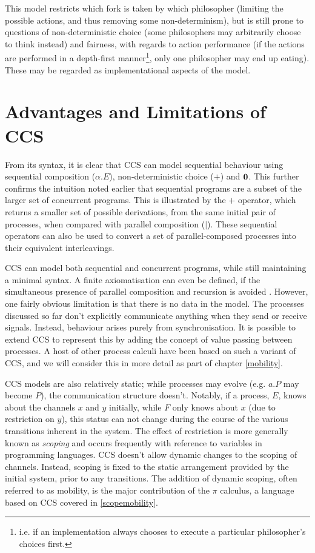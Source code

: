 This model restricts which fork is taken by which philosopher
(limiting the possible actions, and thus removing some
non-determinism), but is still prone to questions of non-deterministic
choice (some philosophers may arbitrarily choose to think instead) and
fairness, with regards to action performance (if the actions are
performed in a depth-first manner\footnote{i.e. if an implementation
  always chooses to execute a particular philosopher's choices
  first.}, only one philosopher may end up eating).  These may be
regarded as implementational aspects of the model.

\section{Advantages and Limitations of CCS}
\label{ccslimit}

From its syntax, it is clear that CCS can model sequential behaviour
using sequential composition ($\alpha.E$), non-deterministic choice
($+$) and $\textbf{0}$.  This further confirms the intuition noted earlier that
sequential programs are a subset of the larger set of concurrent
programs.  This is illustrated by the $+$ operator, which
returns a smaller set of possible derivations, from the same initial
pair of processes, when compared with parallel composition ($|$).
These sequential operators can also be used to convert a set of
parallel-composed processes into their equivalent interleavings.

CCS can model both sequential and concurrent programs, while still
maintaining a minimal syntax.  A finite axiomatisation can even be
defined, if the simultaneous presence of parallel composition and
recursion is avoided \cite{milner:ccsaxiom}.  However, one fairly
obvious limitation is that there is no data in the model.  The
processes discussed so far don't explicitly communicate anything when
they send or receive signals.  Instead, behaviour arises purely from
synchronisation.  It is possible to extend CCS to represent this by
adding the concept of value passing between processes.  A host of
other process calculi have been based on such a variant of CCS, and we
will consider this in more detail as part of chapter \ref{mobility}.

CCS models are also relatively static; while processes may evolve
(e.g. $a.P$ may become $P$), the communication structure doesn't.
Notably, if a process, $E$, knows about the channels $x$ and $y$
initially, while $F$ only knows about $x$ (due to restriction on $y$),
this status can not change during the course of the various
transitions inherent in the system.  The effect of restriction is more
generally known as \emph{scoping} and occurs frequently with reference
to variables in programming languages.  CCS doesn't allow dynamic
changes to the scoping of channels.  Instead, scoping is fixed to the
static arrangement provided by the initial system, prior to any
transitions.  The addition of dynamic scoping, often referred to as
mobility, is the major contribution of the $\pi$ calculus, a language
based on CCS covered in \ref{scopemobility}.

